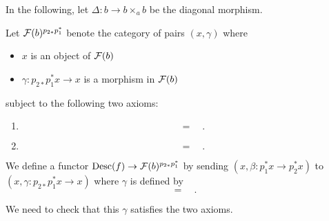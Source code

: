\documentclass{amsart}
\begin{document}
    In the following, let $\Delta:b\to b\times_a b$ be the diagonal morphism.
    \begin{definition}
        Let $\mathcal F(b)^{p_{2\ast}p_1^\ast}$ benote the category of pairs
            $(x,\gamma)$ where
        \begin{itemize}
            \item $x$ is an object of $\mathcal F(b)$
            \item $\gamma:p_{2\ast} p_1^\ast x\to x$ is a morphism in $\mathcal F(b)$
        \end{itemize}
            subject to the following two axioms:
        \begin{enumerate}
            \item 
            \[
                
                \quad=\quad
                
                .
            \]
            \item 
            \[
                
                \quad=\quad
                
                .
            \]
        \end{enumerate}
    \end{definition}
    \begin{definition}
        We define a functor $\operatorname{Desc}(f)\to \mathcal F(b)^{p_{2\ast}p_1^\ast}$
            by sending $(x,\beta:p_1^\ast x\to p_2^\ast x)$ to
            $(x,\gamma:p_{2\ast}p_1^\ast x \to x)$
            where $\gamma$ is defined by
        \[
            
            \quad=\quad
            
            .
        \]
    \end{definition}
    We need to check that this $\gamma$ satisfies the two axioms.
\end{document}
